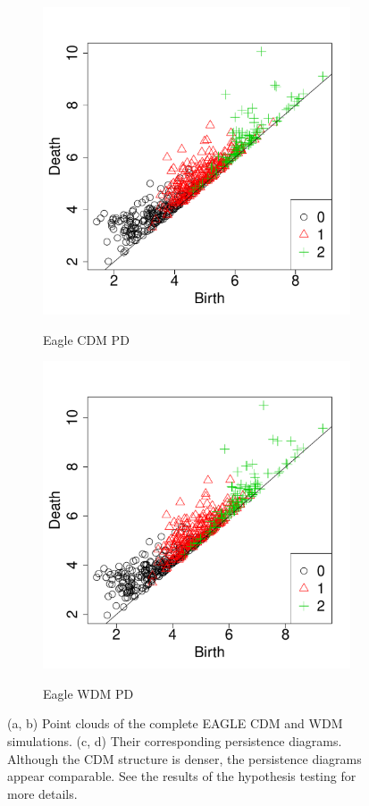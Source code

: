 \documentclass[12pt]{article}
\begin{document}
\begin{figure}[htp!]
\begin{subfigure}{0.24\textwidth}
    \label{fig:eagleDiagsB}
  \end{subfigure}
  \begin{subfigure}{0.24\textwidth}
    \caption{Eagle CDM PD}
    \includegraphics[width=\linewidth]{figure_11_cdm_pd.pdf}
    \label{fig:eagleDiagsC}
  \end{subfigure}
  \begin{subfigure}{0.24\textwidth}
    \caption{Eagle WDM PD}
    \includegraphics[width=\linewidth]{figure_11_wdm_pd.pdf}
    \label{fig:eagleDiagsD}
  \end{subfigure}
  \caption{(a, b) Point clouds of the complete EAGLE CDM and WDM simulations. (c, d) Their corresponding persistence diagrams. Although the CDM structure is denser, the persistence diagrams appear comparable. See the results of the hypothesis testing for more details.}


\end{figure}
\end{document}

